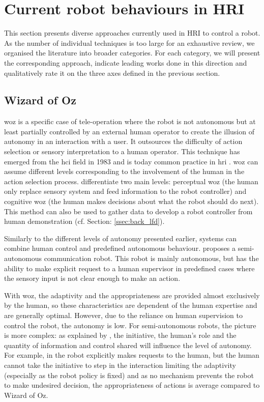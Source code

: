 \section{Current robot behaviours in HRI} \label{sec:back_behaviour}

    This section presents diverse approaches currently used in HRI to control a robot. As the number of individual techniques is too large for an exhaustive review, we organised the literature into broader categories. For each category, we will present the corresponding approach, indicate leading works done in this direction and qualitatively rate it on the three axes defined in the previous section.

\subsection{Wizard of Oz} \label{subsec:WoZ}

	\acrfull{woz} is a specific case of tele-operation where the robot is not autonomous but at least partially controlled by an external human operator to create the illusion of autonomy in an interaction with a user. It outsources the difficulty of action selection or sensory interpretation to a human operator. This technique has emerged from the \gls{hci} field in 1983 \citep{kelley1983empirical} and is today common practice in \gls{hri} \citep{riek2012wizard}. \gls{woz} can assume different levels corresponding to the involvement of the human in the action selection process. \cite{baxter2016characterising} differentiate two main levels: perceptual \gls{woz} (the human only replace sensory system and feed information to the robot controller) and cognitive \gls{woz} (the human makes decisions about what the robot should do next). This method can also be used to gather data to develop a robot controller from human demonstration (cf. Section: \ref{ssec:back_lfd}).
 
	Similarly to the different levels of autonomy presented earlier, systems can combine human control and predefined autonomous behaviour. \citet{shiomi2008semi} proposes a semi-autonomous communication robot. This robot is mainly autonomous, but has the ability to make explicit request to a human supervisor in predefined cases where the sensory input is not clear enough to make an action.
 
	With \gls{woz}, the adaptivity and the appropriateness are provided almost exclusively by the human, so these characteristics are dependent of the human expertise and are generally optimal. However, due to the reliance on human supervision to control the robot, the autonomy is low. For semi-autonomous robots, the picture is more complex: as explained by \cite{beer2014toward}, the initiative, the human's role and the quantity of information and control shared will influence the level of autonomy. For example, in \citep{shiomi2008semi} the robot explicitly makes requests to the human, but the human cannot take the initiative to step in the interaction limiting the adaptivity (especially as the robot policy is fixed) and as no mechanism prevents the robot to make undesired decision, the appropriateness of actions is average compared to Wizard of Oz.
	
